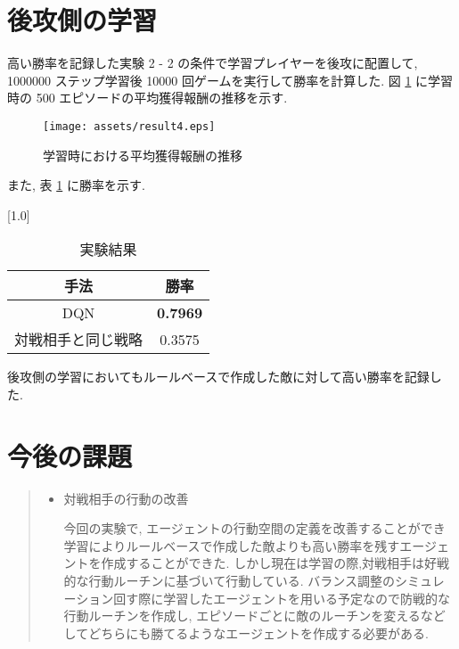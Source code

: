 \documentclass{jarticle}     %
\begin{document}
\section{後攻側の学習}
高い勝率を記録した実験 2 - 2 の条件で学習プレイヤーを後攻に配置して, 1000000 ステップ学習後 10000 回ゲームを実行して勝率を計算した.
図 \ref{fig:result4} に学習時の 500 エピソードの平均獲得報酬の推移を示す.

\begin{figure}[h]
  \centering
  \texttt{[image: assets/result4.eps]}
  \caption{学習時における平均獲得報酬の推移}
  \label{fig:result4}
\end{figure}

また, 表 \ref{table:result4} に勝率を示す.

\begin{table}[t]
\centering
\caption{実験結果}
\vspace{-0.3cm}
\label{table:result4}
\scalebox{1.0}[1.0]{
  \begin{tabular}{|c|c|}
    \hline
    手法 & 勝率 \\ \hline
    DQN & \textbf{0.7969} \\ \hline
    対戦相手と同じ戦略 & 0.3575 \\ \hline

    \end{tabular}
}
\end{table}
後攻側の学習においてもルールベースで作成した敵に対して高い勝率を記録した.

\section{今後の課題}

\begin{quote}
  \begin{itemize}
   \item 対戦相手の行動の改善
   \par
   今回の実験で, エージェントの行動空間の定義を改善することができ学習によりルールベースで作成した敵よりも高い勝率を残すエージェントを作成することができた.
   しかし現在は学習の際,対戦相手は好戦的な行動ルーチンに基づいて行動している. バランス調整のシミュレーション回す際に学習したエージェントを用いる予定なので防戦的な行動ルーチンを作成し, エピソードごとに敵のルーチンを変えるなどしてどちらにも勝てるようなエージェントを作成する必要がある.
  \end{itemize}
 \end{quote}
\end{document}
